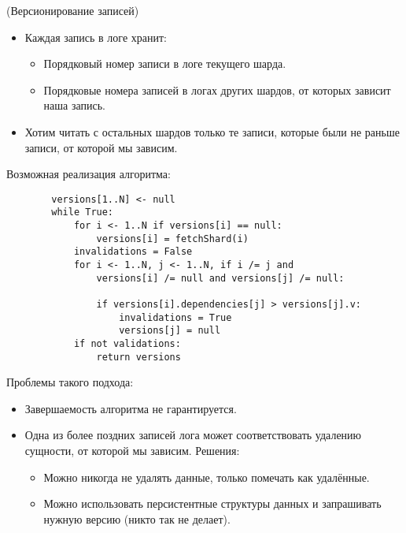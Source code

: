 \begin{algorithm}(Версионирование записей)
    \begin{itemize}
        \item Каждая запись в логе хранит:
        \begin{itemize}
            \item Порядковый номер записи в логе текущего шарда.
            \item Порядковые номера записей в логах других шардов, от которых зависит наша запись.
        \end{itemize}
        \item Хотим читать с остальных шардов только те записи, которые были не раньше записи, от которой мы зависим.
    \end{itemize}

    Возможная реализация алгоритма:
    \begin{lstlisting}
        versions[1..N] <- null
        while True:
            for i <- 1..N if versions[i] == null:
                versions[i] = fetchShard(i)
            invalidations = False
            for i <- 1..N, j <- 1..N, if i /= j and
                versions[i] /= null and versions[j] /= null:

                if versions[i].dependencies[j] > versions[j].v:
                    invalidations = True
                    versions[j] = null
            if not validations:
                return versions
    \end{lstlisting}

    Проблемы такого подхода:
    \begin{itemize}
        \item Завершаемость алгоритма не гарантируется.
        \item Одна из более поздних записей лога может соответствовать удалению сущности, от которой мы зависим. Решения:
        \begin{itemize}
            \item Можно никогда не удалять данные, только помечать как удалённые.
            \item Можно использовать персистентные структуры данных и запрашивать нужную версию (никто так не делает).
        \end{itemize}
    \end{itemize}
\end{algorithm}
